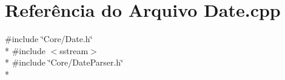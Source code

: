 \section{Referência do Arquivo Date.\+cpp}
\label{_core_2_date_8cpp}
{\ttfamily \#include \char`\"{}Core/\+Date.\+h\char`\"{}}\\*
{\ttfamily \#include $<$sstream$>$}\\*
{\ttfamily \#include \char`\"{}Core/\+Date\+Parser.\+h\char`\"{}}\\*
